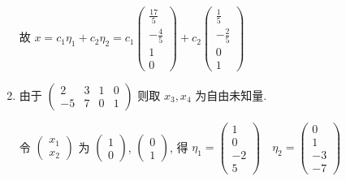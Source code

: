 \begin{enumerate}
			       故 \( x = c_{1}\eta_{1} + c_{2}\eta_{2} = c_{1}\begin{pmatrix}
				       \frac{17}{5} \\
				       -\frac{4}{5} \\
				       1            \\
				       0
			       \end{pmatrix} + c_{2}\begin{pmatrix}
				       \frac{1}{5}  \\
				       -\frac{2}{5} \\
				       0            \\
				       1
			       \end{pmatrix} \)
			 \item %
			       由于 \( \begin{pmatrix}
				       2  & 3 & 1 & 0 \\
				       -5 & 7 & 0 & 1
			       \end{pmatrix} \) 则取 \( x_{3}, x_{4} \) 为自由未知量.

			       令 \( \begin{pmatrix}
				       x_{1} \\
				       x_{2}
			       \end{pmatrix} \) 为 \( \begin{pmatrix}
				       1 \\
				       0
			       \end{pmatrix} \), \( \begin{pmatrix}
				       0 \\
				       1
			       \end{pmatrix} \), 得 \( \eta_{1} = \begin{pmatrix}
				       1  \\
				       0  \\
				       -2 \\
				       5
			       \end{pmatrix} \quad \eta_{2} = \begin{pmatrix}
				       0  \\
				       1  \\
				       -3 \\
				       -7
			       \end{pmatrix} \)


\end{enumerate}
